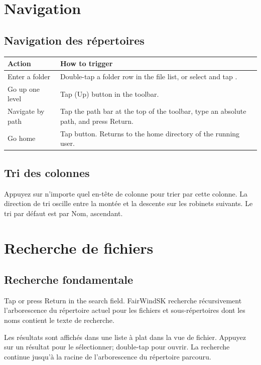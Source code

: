 \section{Navigation}

\subsection{Navigation des répertoires}

\begin{longtable}{L{3cm} L{10.7cm}}
\toprule
{}
{\sffamily\bfseries\color{white} Action} &
{\sffamily\bfseries\color{white} How to trigger} \\
\midrule
Enter a folder & Double-tap a folder row in the file list, or select and tap . \\
Go up one level & Tap  (Up) button in the toolbar. \\
Navigate by path & Tap the path bar at the top of the toolbar, type an absolute path, and press Return. \\
Go home & Tap  button. Returns to the home directory of the running user. \\
\bottomrule
\end{longtable}

\subsection{Tri des colonnes}

Appuyez sur n'importe quel en-tête de colonne pour trier par cette colonne.
La direction de tri oscille entre la montée et la descente sur les robinets suivants.
Le tri par défaut est par Nom, ascendant.

\section{Recherche de fichiers}

\subsection{Recherche fondamentale}

Tap  or press Return in the search field.
FairWindSK recherche récursivement l'arborescence du répertoire actuel pour les fichiers et sous-répertoires dont les noms
contient le texte de recherche.

Les résultats sont affichés dans une liste à plat dans la vue de fichier.
Appuyez sur un résultat pour le sélectionner; double-tap pour ouvrir.
La recherche continue jusqu'à la racine de l'arborescence du répertoire parcouru.


